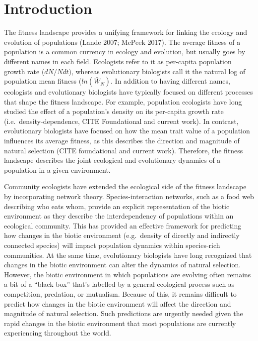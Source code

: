 \documentclass[]{elsarticle} %
\begin{document}
\section{Introduction}\label{introduction}

The fitness landscape provides a unifying framework for linking the
ecology and evolution of populations (Lande 2007; McPeek 2017). The
average fitness of a population is a common currency in ecology and
evolution, but usually goes by different names in each field. Ecologists
refer to it as per-capita population growth rate (\(dN/Ndt\)), whereas
evolutionary biologists call it the natural log of population mean
fitness (\(ln(\bar W_N)\). In addition to having different names,
ecologists and evolutionary biologists have typically focused on
different processes that shape the fitness landscape. For example,
population ecologists have long studied the effect of a population's
density on its per-capita growth rate (i.e.~density-dependence, CITE
Foundational and current work). In contrast, evolutionary biologists
have focused on how the mean trait value of a population influences its
average fitness, as this describes the direction and magnitude of
natural selection (CITE foundational and current work). Therefore, the
fitness landscape describes the joint ecological and evolutionary
dynamics of a population in a given environment.

Community ecologists have extended the ecological side of the fitness
landscape by incorporating network theory. Species-interaction networks,
such as a food web describing who eats whom, provide an explicit
representation of the biotic environment as they describe the
interdependency of populations within an ecological community. This has
provided an effective framework for predicting how changes in the biotic
environment (e.g.~density of directly and indirectly connected species)
will impact population dynamics within species-rich communities. At the
same time, evolutionary biologists have long recognized that changes in
the biotic environment can alter the dynamics of natural selection.
However, the biotic environment in which populations are evolving often
remains a bit of a ``black box'' that's labelled by a general ecological
process such as competition, predation, or mutualism. Because of this,
it remains difficult to predict how changes in the biotic environment
will affect the direction and magnitude of natural selection. Such
predictions are urgently needed given the rapid changes in the biotic
environment that most populations are currently experiencing throughout
the world.
\end{document}
